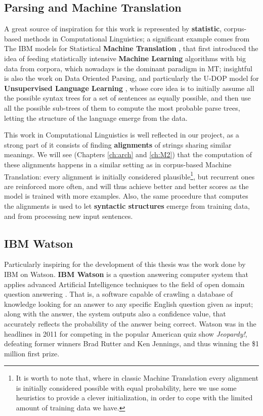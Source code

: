\subsection{Parsing and Machine Translation}
A great source of inspiration for this work is represented by \textbf{statistic}, corpus-based methods in Computational Linguistics; a significant example comes from The IBM models for Statistical \textbf{Machine Translation} \citep{Brown:1993:MSM:972470.972474}, that first introduced the idea of feeding statistically intensive \textbf{Machine Learning} algorithms with big data from corpora, which nowadays is the dominant paradigm in MT; insightful is also the work on Data Oriented Parsing, and particularly the U-DOP model for \textbf{Unsupervised Language Learning} \citep{Bod:2006:UPU:1596276.1596293}, whose core idea is to initially assume all the possible syntax trees for a set of sentences as equally possible, and then use all the possible sub-trees of them to compute the most probable parse trees, letting the structure of the language emerge from the data.

This work in Computational Linguistics is well reflected in our project, as a strong part of it consists of finding \textbf{alignments} of strings sharing similar meanings. We will see (Chapters \ref{ch:arch} and \ref{ch:M2}) that the computation of these alignments happens in a similar setting as in corpus-based Machine Translation: every alignment is initially considered plausible\footnote{It is worth to note that, where in classic Machine Translation every alignment is initially considered possible with equal probability, here we use some heuristics to provide a clever initialization, in order to cope with the limited amount of training data we have.}, but recurrent ones are reinforced more often, and will thus achieve better and better scores as the model is trained with more examples. Also, the same procedure that computes the alignments is used to let \textbf{syntactic structures} emerge from training data, and from processing new input sentences.

\subsection{IBM Watson}
Particularly inspiring for the development of this thesis was the work done by IBM on Watson. \textbf{IBM Watson} is a question answering computer system that applies advanced Artificial Intelligence techniques to the field of open domain question answering \citep{Ferrucci:2011:IW:2024723.2019525}. That is, a software capable of crawling a database of knowledge looking for an answer to any specific English question given as input; along with the answer, the system outputs also a confidence value, that accurately reflects the probability of the answer being correct. Watson was in the headlines in 2011 for competing in the popular American quiz show \textit{Jeopardy!}, defeating former winners  Brad Rutter and Ken Jennings, and thus winning the \$1 million first prize.


